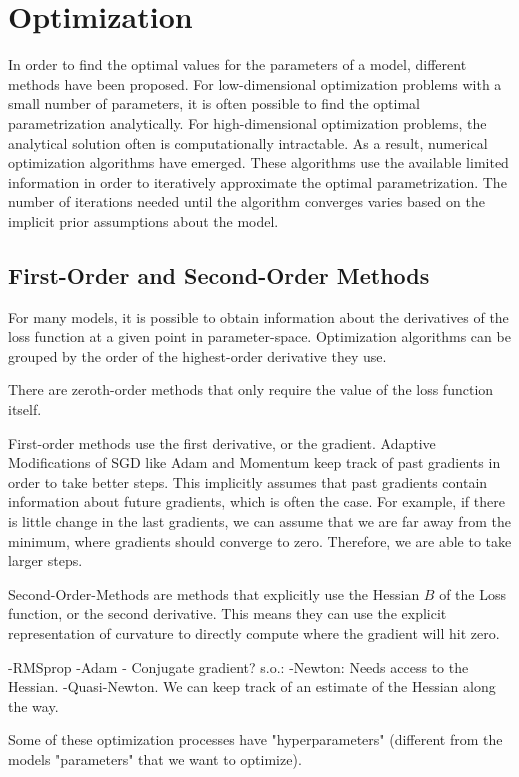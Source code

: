 \documentclass[twoside,12pt,a4paper]{report}
\begin{document}
\section{Optimization}
In order to find the optimal values for the parameters of a model, different methods have been proposed. For low-dimensional optimization problems with a small number of parameters, it is often possible to find the optimal parametrization analytically. For high-dimensional optimization problems, the analytical solution often is computationally intractable. As a result, numerical optimization algorithms have emerged.
These algorithms use the available limited information in order to iteratively approximate the optimal parametrization. The number of iterations needed until the algorithm converges varies based on the implicit prior assumptions about the model.

\subsection{First-Order and Second-Order Methods}
For many models, it is possible to obtain information about the derivatives of the loss function  at a given point in parameter-space. Optimization algorithms can be grouped by the order of the highest-order derivative they use.

There are zeroth-order methods that only require the value of the loss function itself. 

First-order methods use the first derivative, or the gradient. Adaptive Modifications of SGD like Adam and Momentum keep track of past gradients in order to take better steps. This implicitly assumes that past gradients contain information about future gradients, which is often the case. For example, if there is little change in the last gradients, we can assume that we are far away from the minimum, where gradients should converge to zero. Therefore, we are able to take larger steps.

Second-Order-Methods are methods that explicitly use the Hessian $B$ of the Loss function, or the second derivative. This means they can use the explicit representation of curvature to directly compute where the gradient will hit zero.

-RMSprop
-Adam
- Conjugate gradient?
s.o.:
-Newton: Needs access to the Hessian.
-Quasi-Newton.
We can keep track of an estimate of the Hessian along the way.


Some of these optimization processes have "hyperparameters" (different from the models "parameters" that we want to optimize).
\end{document}
